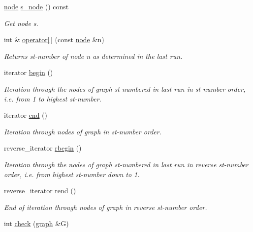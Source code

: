 \begin{DoxyCompactItemize}
\mbox{\hyperlink{classnode}{node}} \mbox{\hyperlink{classst__number_aba061fba83eb63b7a23dd685e1db663c}{s\+\_\+node}} () const
\begin{DoxyCompactList}\small\item\em Get node {\itshape s}. \end{DoxyCompactList}\item 
int \& \mbox{\hyperlink{classst__number_a969162a10da5daba4219419d45c4be51}{operator\mbox{[}$\,$\mbox{]}}} (const \mbox{\hyperlink{classnode}{node}} \&n)
\begin{DoxyCompactList}\small\item\em Returns st-\/number of node {\ttfamily n} as determined in the last run. \end{DoxyCompactList}\item 
iterator \mbox{\hyperlink{classst__number_a1eddb2577b16109d22cde98a8ffde057}{begin}} ()
\begin{DoxyCompactList}\small\item\em Iteration through the nodes of graph st-\/numbered in last run in st-\/number order, i.\+e. from 1 to highest st-\/number. \end{DoxyCompactList}\item 
iterator \mbox{\hyperlink{classst__number_a3912b83a8cbddcb1fc804d20be528d52}{end}} ()
\begin{DoxyCompactList}\small\item\em Iteration through nodes of graph in st-\/number order. \end{DoxyCompactList}\item 
reverse\+\_\+iterator \mbox{\hyperlink{classst__number_a56f2c67e9b49362947fe0c99278f6d31}{rbegin}} ()
\begin{DoxyCompactList}\small\item\em Iteration through the nodes of graph st-\/numbered in last run in reverse st-\/number order, i.\+e. from highest st-\/number down to 1. \end{DoxyCompactList}\item 
reverse\+\_\+iterator \mbox{\hyperlink{classst__number_a4c5fdce6ab2be7ee9ddbb09e8d5c8560}{rend}} ()
\begin{DoxyCompactList}\small\item\em End of iteration through nodes of graph in reverse st-\/number order. \end{DoxyCompactList}\item 
int \mbox{\hyperlink{classst__number_a2aad4550b821c52d6998bff35fd8648f}{check}} (\mbox{\hyperlink{classgraph}{graph}} \&G)

\end{DoxyCompactItemize}

